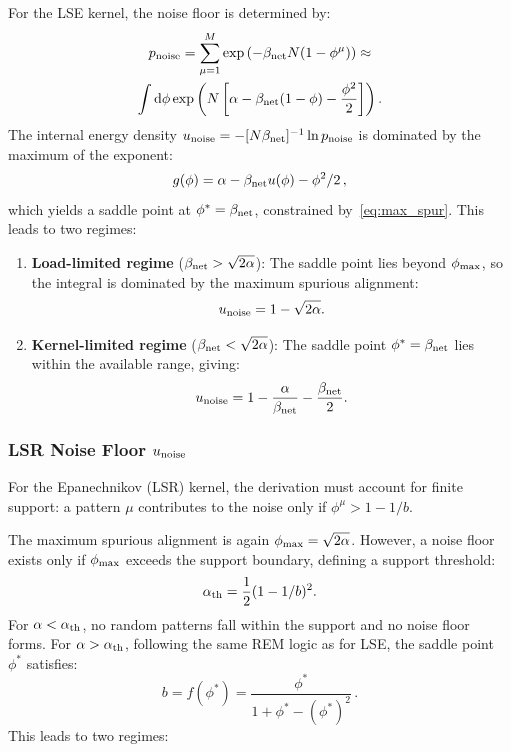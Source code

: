 \documentclass{article}
\newcommand{\dd}{{\mathrm{d}}}
\theoremstyle{plain}
\theoremstyle{definition}
\theoremstyle{remark}
\begin{document}
For the LSE kernel, the noise floor is determined by:
\begin{multline}
    p_{\rm noise} = \sum_{\mu=1}^{M} \exp\left( -\beta_{\rm net} N (1 - \phi^\mu) \right) \approx \\
    \int \dd\phi \exp\left( N \left[ \alpha - \beta_{\rm net}(1 - \phi) - \frac{\phi^2}{2} \right] \right).
\end{multline}
The internal energy density $u_{\rm noise} = -[N\beta_{\rm net}]^{-1} \ln p_{\rm noise}$ is dominated by the maximum of the exponent:
\begin{equation}
    g(\phi) = \alpha - \beta_{\rm net} u(\phi) - \phi^2/2\,,
    \label{eq:g_phi}
\end{equation}
which yields a saddle point at $\phi^* = \beta_{\rm net}$, constrained by~\eqref{eq:max_spur}. This leads to two regimes:

\begin{enumerate}
    \item \textbf{Load-limited regime} ($\beta_{\rm net} > \sqrt{2\alpha}$): The saddle point lies beyond $\phi_{\rm max}$, so the integral is dominated by the maximum spurious alignment:
    \begin{equation}
        u_{\rm noise} = 1 - \sqrt{2\alpha}.
    \end{equation}

    \item \textbf{Kernel-limited regime} ($\beta_{\rm net} < \sqrt{2\alpha}$): The saddle point $\phi^* = \beta_{\rm net}$ lies within the available range, giving:
    \begin{equation}
        u_{\rm noise} = 1 - \frac{\alpha}{\beta_{\rm net}} - \frac{\beta_{\rm net}}{2}.
    \end{equation}
\end{enumerate}


\subsubsection{LSR Noise Floor $u_{\rm noise}$}
For the Epanechnikov (LSR) kernel, the derivation must account for finite support: a pattern $\mu$ contributes to the noise only if $\phi^\mu > 1 - 1/b$.

The maximum spurious alignment is again $\phi_{\rm max} = \sqrt{2\alpha}$. However, a noise floor exists only if $\phi_{\rm max}$ exceeds the support boundary, defining a support threshold:
\begin{equation}
    \alpha_{\rm th} = \frac{1}{2} (1 - 1/b)^2 .
    \label{eq:alpha_th}
\end{equation}
For $\alpha < \alpha_{\rm th}$, no random patterns fall within the support and no noise floor forms. For $\alpha > \alpha_{\rm th}$, following the same REM logic as for LSE, the saddle point $\phi^*$ satisfies:
\begin{equation}
    b = f(\phi^*) = \frac{\phi^*}{1 + \phi^* - (\phi^*)^2}\,.
\end{equation}
This leads to two regimes:
\end{document}
